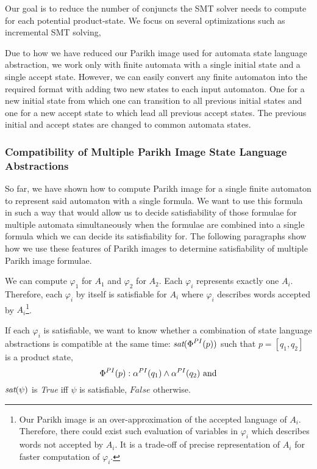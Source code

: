 Our goal is to reduce the number of conjuncts the SMT solver needs to compute for each potential product-state. We focus on several optimizations such as incremental SMT solving,

Due to how we have reduced our Parikh image used for automata state language abstraction, we work only with finite automata with a single initial state and a single accept state. However, we can easily convert any finite automaton into the required format with adding two new states to each input automaton. One for a new initial state from which one can transition to all previous initial states and one for a new accept state to which lead all previous accept states. The previous initial and accept states are changed to common automata states.


\subsubsection{Compatibility of Multiple Parikh Image State Language Abstractions}

So far, we have shown how to compute Parikh image for a single finite automaton to represent said automaton with a single formula. We want to use this formula in such a way that would allow us to decide satisfiability of those formulae for multiple automata simultaneously when the formulae are combined into a single formula which we can decide its satisfiability for. The following paragraphs show how we use these features of Parikh images to determine satisfiability of multiple Parikh image formulae.

We can compute $\varphi_1$ for $A_1$ and $\varphi_2$ for $A_2$. Each $\varphi_i$ represents exactly one $A_i$. Therefore, each $\varphi_i$ by itself is satisfiable for $A_i$ where $\varphi_i$ describes words accepted by $A_i$\footnote{Our Parikh image is an over-approximation of the accepted language of $A_i$. Therefore, there could exist such evaluation of variables in $\varphi_i$ which describes words not accepted by $A_i$. It is a trade-off of precise representation of $A_i$ for faster computation of $\varphi_i$.}.

If each $\varphi_i$ is satisfiable, we want to know whether a combination of state language abstractions is compatible at the same time: $\emph{sat}(\emph{$\Phi$}^{PI}(p))$ such that $p = [q_1, q_2]$ is a product state,
\[
    \emph{$\Phi$}^{PI}(p) : \alpha^{PI}(q_1) \wedge \alpha^{PI}(q_2) \text{ and}
\]
$\emph{sat}(\psi)$ is \emph{True} iff $\psi$ is satisfiable, $False$ otherwise.

